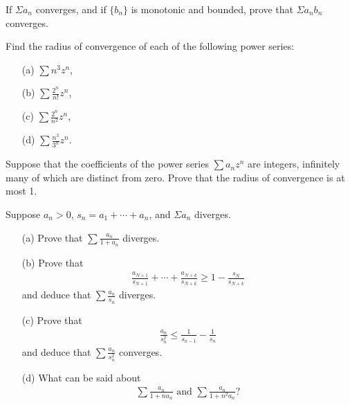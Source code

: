   \begin{exercise}[Rudin 3.8]
    If $\Sigma a_n$ converges, and if $\{b_n\}$ is monotonic and bounded, prove that $\Sigma a_n b_n$ converges.
  \end{exercise}
  \begin{solution}
    
  \end{solution}

  \begin{exercise}[Rudin 3.9]
    Find the radius of convergence of each of the following power series:
    \begin{enumerate} 
      \item[(a)] $\sum n^3 z^n$,
      \item[(b)] $\sum \frac{2^n}{n!} z^n$,
      \item[(c)] $\sum \frac{2^n}{n^2} z^n$,
      \item[(d)] $\sum \frac{n^3}{3^n} z^n$.
    \end{enumerate}
  \end{exercise}
  \begin{solution}
    
  \end{solution}

  \begin{exercise}[Rudin 3.10]
    Suppose that the coefficients of the power series $\sum a_n z^n$ are integers, infinitely many of which are distinct from zero. Prove that the radius of convergence is at most 1.
  \end{exercise}
  \begin{solution}
    
  \end{solution}

  \begin{exercise}[Rudin 3.11]
    Suppose $a_n > 0$, $s_n = a_1 + \cdots + a_n$, and $\Sigma a_n$ diverges.
    \begin{enumerate} 
      \item[(a)] Prove that $\sum \frac{a_n}{1+a_n}$ diverges.
      \item[(b)] Prove that
      \begin{align*}
        \frac{a_{N+1}}{s_{N+1}} + \cdots + \frac{a_{N+k}}{s_{N+k}} \geq 1 - \frac{s_N}{s_{N+k}}
      \end{align*}
      and deduce that $\sum \frac{a_n}{s_n}$ diverges.
      \item[(c)] Prove that
      \begin{align*}
        \frac{a_n}{s_n^2} \leq \frac{1}{s_{n-1}} - \frac{1}{s_n}
      \end{align*}
      and deduce that $\sum \frac{a_n}{s_n^2}$ converges.
      \item[(d)] What can be said about
      \begin{align*}
        \sum \frac{a_n}{1+na_n} \text{ and } \sum \frac{a_n}{1+n^2a_n}?
      \end{align*}
    \end{enumerate}
  \end{exercise}
  \begin{solution}
    
  \end{solution}

